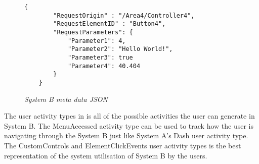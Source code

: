 \begin{figure}[!htb]
	\centering
	\begin{lstlisting}[style=json] 
	{
		"RequestOrigin" : "/Area4/Controller4",
		"RequestElementID" : "Button4",
		"RequestParameters": {
			"Parameter1": 4,
			"Parameter2": "Hello World!",
			"Parameter3": true
			"Parameter4": 40.404
		}
	}
	\end{lstlisting}
	\caption[System B meta data JSON]
	{\textit{System B meta data JSON}}\label{fig:CH2_SystemBMetaData}
\end{figure}

\clearpage

The user activity types in  is all of the possible activities the user can generate in System B. The MenuAccessed activity type can be used to track how the user is navigating through the System B just like System A's Dash user activity type. The CustomControls and ElementClickEvents user activity types is the best representation of the system utilisation of System B by the users.

